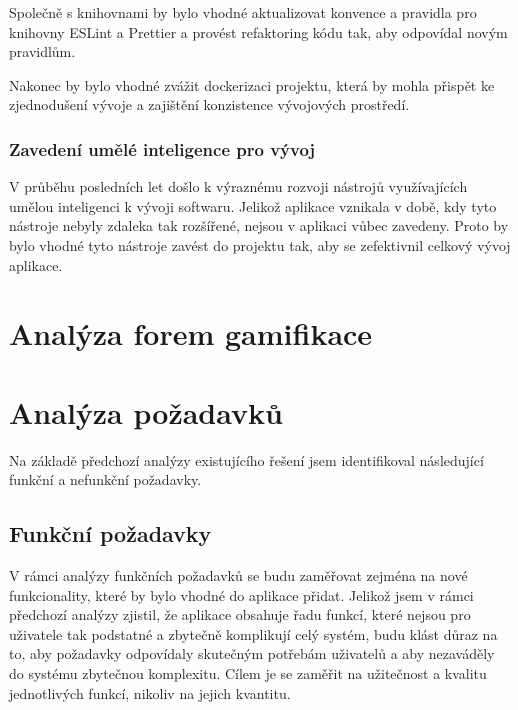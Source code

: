 Společně s knihovnami by bylo vhodné aktualizovat konvence a pravidla pro knihovny ESLint a Prettier a provést refaktoring kódu tak, aby odpovídal novým pravidlům.

Nakonec by bylo vhodné zvážit dockerizaci projektu, která by mohla přispět ke zjednodušení vývoje a zajištění konzistence vývojových prostředí.

\subsubsection{Zavedení umělé inteligence pro vývoj}

V průběhu posledních let došlo k výraznému rozvoji nástrojů využívajících umělou inteligenci k vývoji softwaru. Jelikož aplikace vznikala v době, kdy tyto nástroje nebyly zdaleka tak rozšířené, nejsou v aplikaci vůbec zavedeny. Proto by bylo vhodné tyto nástroje zavést do projektu tak, aby se zefektivnil celkový vývoj aplikace.


\section{Analýza forem gamifikace}

\section{Analýza požadavků}

Na základě předchozí analýzy existujícího řešení jsem identifikoval následující funkční a nefunkční požadavky.

\subsection{Funkční požadavky}

V rámci analýzy funkčních požadavků se budu zaměřovat zejména na nové funkcionality, které by bylo vhodné do aplikace přidat. Jelikož jsem v rámci předchozí analýzy zjistil, že aplikace obsahuje řadu funkcí, které nejsou pro uživatele tak podstatné a zbytečně komplikují celý systém, budu klást důraz na to, aby požadavky odpovídaly skutečným potřebám uživatelů a aby nezaváděly do systému zbytečnou komplexitu. Cílem je se zaměřit na užitečnost a kvalitu jednotlivých funkcí, nikoliv na jejich kvantitu. 

